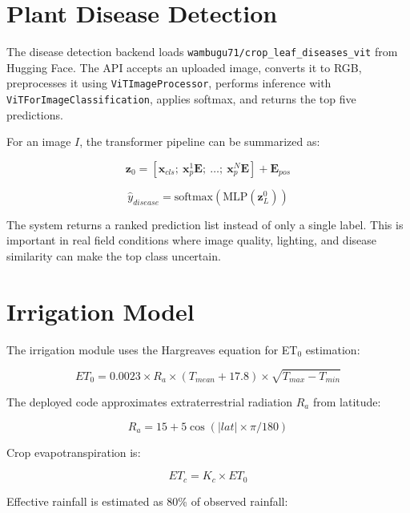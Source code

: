 \documentclass[12pt,a4paper]{report}
\begin{document}
\section{Plant Disease Detection}

The disease detection backend loads \texttt{wambugu71/crop\_leaf\_diseases\_vit} from Hugging Face. The API accepts an uploaded image, converts it to RGB, preprocesses it using \texttt{ViTImageProcessor}, performs inference with \texttt{ViTForImageClassification}, applies softmax, and returns the top five predictions.

For an image $I$, the transformer pipeline can be summarized as:

\begin{equation}
\mathbf{z}_0 = [\mathbf{x}_{cls};\ \mathbf{x}_{p}^{1}\mathbf{E};\ \ldots;\ \mathbf{x}_{p}^{N}\mathbf{E}] + \mathbf{E}_{pos}
\end{equation}

\begin{equation}
\hat{y}_{disease} = \text{softmax}(\text{MLP}(\mathbf{z}_{L}^{0}))
\end{equation}

The system returns a ranked prediction list instead of only a single label. This is important in real field conditions where image quality, lighting, and disease similarity can make the top class uncertain.

\section{Irrigation Model}

The irrigation module uses the Hargreaves equation for ET$_0$ estimation:

\begin{equation}
ET_0 = 0.0023 \times R_a \times (T_{mean} + 17.8) \times \sqrt{T_{max} - T_{min}}
\end{equation}

The deployed code approximates extraterrestrial radiation $R_a$ from latitude:

\begin{equation}
R_a = 15 + 5\cos(|lat| \times \pi / 180)
\end{equation}

Crop evapotranspiration is:

\begin{equation}
ET_c = K_c \times ET_0
\end{equation}

Effective rainfall is estimated as 80\% of observed rainfall:
\end{document}
